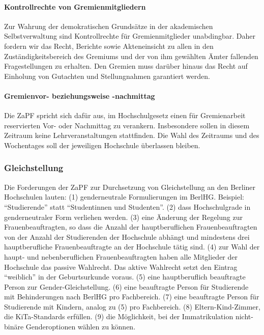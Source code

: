 \hypertarget{kontrollrechte-von-gremienmitgliedern}{%
\paragraph{Kontrollrechte von
Gremienmitgliedern}\label{kontrollrechte-von-gremienmitgliedern}}

Zur Wahrung der demokratischen Grundsätze in der akademischen
Selbstverwaltung sind Kontrollrechte für Gremienmitglieder unabdingbar.
Daher fordern wir das Recht, Berichte sowie Akteneinsicht zu allen in
den Zuständigkeitsbereich des Gremiums und der von ihm gewählten Ämter
fallenden Fragestellungen zu erhalten. Den Gremien muss darüber hinaus
das Recht auf Einholung von Gutachten und Stellungnahmen garantiert
werden.

\hypertarget{gremienvor--beziehungsweise--nachmittag}{%
\paragraph{Gremienvor- beziehungsweise
-nachmittag}\label{gremienvor--beziehungsweise--nachmittag}}

Die ZaPF spricht sich dafür aus, im Hochschulgesetz einen für
Gremienarbeit reservierten Vor- oder Nachmittag zu verankern.
Insbesondere sollen in diesem Zeitraum keine Lehrveranstaltungen
stattfinden. Die Wahl des Zeitraums und des Wochentages soll der
jeweiligen Hochschule überlassen bleiben.

\hypertarget{gleichstellung}{%
\subsubsection{Gleichstellung}\label{gleichstellung}}

Die Forderungen der ZaPF zur Durchsetzung von Gleichstellung an den
Berliner Hochschulen lauten: (1) genderneutrale Formulierungen im
BerlHG. Beispiel: ``Studierende'' statt ``Studentinnen und Studenten''.
(2) dass Hochschulgrade in genderneutraler Form verliehen werden. (3)
eine Änderung der Regelung zur Frauenbeauftragten, so dass die Anzahl
der hauptberuflichen Frauenbeauftragten von der Anzahl der Studierenden
der Hochschule abhängt und mindestens drei hauptberufliche
Frauenbeauftragte an der Hochschule tätig sind. (4) zur Wahl der haupt-
und nebenberuflichen Frauenbeauftragten haben alle Mitglieder der
Hochschule das passive Wahlrecht. Das aktive Wahlrecht setzt den Eintrag
``weiblich'' in der Geburtsurkunde voraus. (5) eine hauptberuflich
beauftragte Person zur Gender-Gleichstellung. (6) eine beauftragte
Person für Studierende mit Behinderungen nach BerlHG pro Fachbereich.
(7) eine beauftragte Person für Studierende mit Kindern, analog zu (5)
pro Fachbereich. (8) Eltern-Kind-Zimmer, die KiTa-Standards erfüllen.
(9) die Möglichkeit, bei der Immatrikulation nicht-binäre Genderoptionen
wählen zu können.

